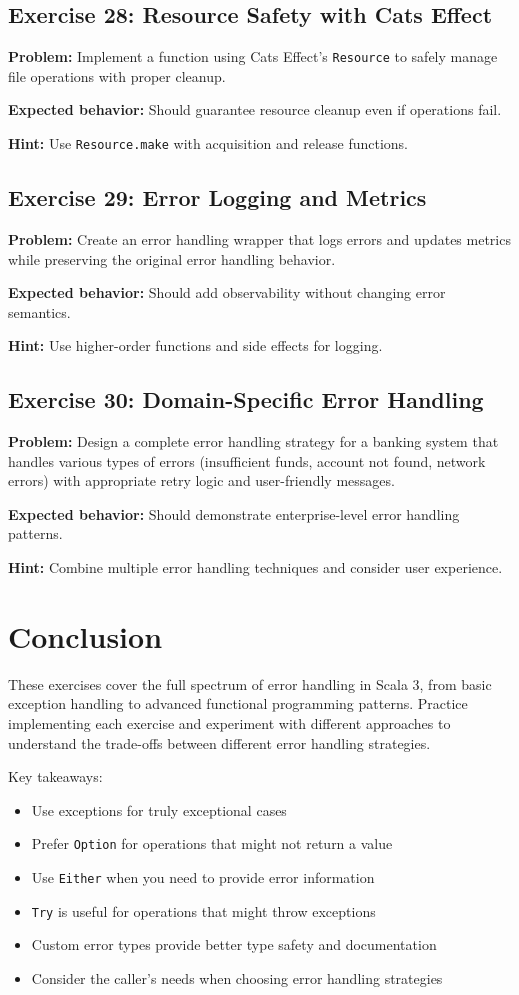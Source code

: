 \documentclass[12pt,a4paper]{article}
\begin{document}
\subsection{Exercise 28: Resource Safety with Cats Effect}
\textbf{Problem:} Implement a function using Cats Effect's \texttt{Resource} to safely manage file operations with proper cleanup.

\textbf{Expected behavior:} Should guarantee resource cleanup even if operations fail.

\textbf{Hint:} Use \texttt{Resource.make} with acquisition and release functions.

\subsection{Exercise 29: Error Logging and Metrics}
\textbf{Problem:} Create an error handling wrapper that logs errors and updates metrics while preserving the original error handling behavior.

\textbf{Expected behavior:} Should add observability without changing error semantics.

\textbf{Hint:} Use higher-order functions and side effects for logging.

\subsection{Exercise 30: Domain-Specific Error Handling}
\textbf{Problem:} Design a complete error handling strategy for a banking system that handles various types of errors (insufficient funds, account not found, network errors) with appropriate retry logic and user-friendly messages.

\textbf{Expected behavior:} Should demonstrate enterprise-level error handling patterns.

\textbf{Hint:} Combine multiple error handling techniques and consider user experience.

\section{Conclusion}

These exercises cover the full spectrum of error handling in Scala 3, from basic exception handling to advanced functional programming patterns. Practice implementing each exercise and experiment with different approaches to understand the trade-offs between different error handling strategies.

Key takeaways:
\begin{itemize}
\item Use exceptions for truly exceptional cases
\item Prefer \texttt{Option} for operations that might not return a value
\item Use \texttt{Either} when you need to provide error information
\item \texttt{Try} is useful for operations that might throw exceptions
\item Custom error types provide better type safety and documentation
\item Consider the caller's needs when choosing error handling strategies
\end{itemize}
\end{document}
